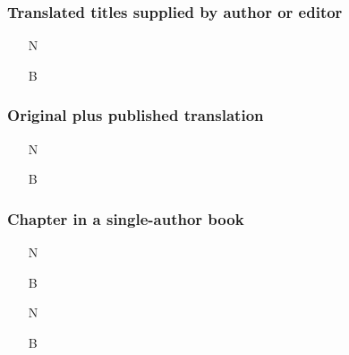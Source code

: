 \documentclass[11pt,letterpaper,oneside]{article}
\begin{document}
\setcounter{subsubsection}{107}
\subsubsection{Translated titles supplied by author or editor}

\begin{itemize}
\item[N] 

\item[B] 
\end{itemize}

\setcounter{subsubsection}{108}
\subsubsection{Original plus published translation}

\begin{itemize}
\item[N] 

\item[B] 
\end{itemize}




\setcounter{subsubsection}{110}
\subsubsection{Chapter in a single-author book}

\begin{itemize}
\item[N] 

\item[B] 

\item[N] 

\item[B] 
\end{itemize}
\end{document}
